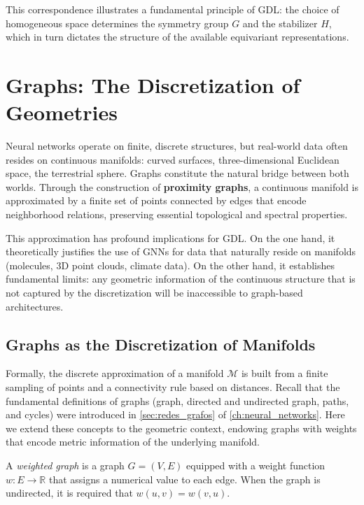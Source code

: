 \begin{remark}
	This correspondence illustrates a fundamental principle of \gls{GDL}: the choice of homogeneous space determines the symmetry group $G$ and the stabilizer $H$, which in turn dictates the structure of the available equivariant representations.
\end{remark}


\section{Graphs: The Discretization of Geometries}\label{sec:grafos_discretizacion}

Neural networks operate on finite, discrete structures, but real-world data often resides on continuous manifolds: curved surfaces, three-dimensional Euclidean space, the terrestrial sphere. Graphs constitute the natural bridge between both worlds. Through the construction of \textbf{proximity graphs}, a continuous manifold is approximated by a finite set of points connected by edges that encode neighborhood relations, preserving essential topological and spectral properties.

This approximation has profound implications for \gls{GDL}. On the one hand, it theoretically justifies the use of \glspl{GNN} for data that naturally reside on manifolds (molecules, 3D point clouds, climate data). On the other hand, it establishes fundamental limits: any geometric information of the continuous structure that is not captured by the discretization will be inaccessible to graph-based architectures.

\subsection{Graphs as the Discretization of Manifolds}\label{subsec:grafos_discretizacion_variedades}

Formally, the discrete approximation of a manifold $\mathcal{M}$ is built from a finite sampling of points and a connectivity rule based on distances. Recall that the fundamental definitions of graphs (graph, directed and undirected graph, paths, and cycles) were introduced in \autoref{sec:redes_grafos} of \autoref{ch:neural_networks}. Here we extend these concepts to the geometric context, endowing graphs with weights that encode metric information of the underlying manifold.

\begin{definition}\label{def:grafo_ponderado}
	A \textit{weighted graph} is a graph $G = (V, E)$ equipped with a weight function $w: E \to \mathbb{R}$ that assigns a numerical value to each edge. When the graph is undirected, it is required that $w(u,v) = w(v,u)$.
\end{definition}

